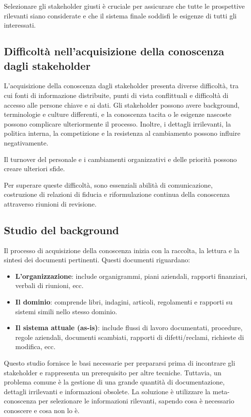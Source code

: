 Selezionare gli stakeholder giusti è cruciale per assicurare che tutte le
prospettive rilevanti siano considerate e che il sistema finale soddisfi le
esigenze di tutti gli interessati.

\subsection{Difficoltà nell'acquisizione della conoscenza dagli stakeholder}

L'acquisizione della conoscenza dagli stakeholder presenta diverse difficoltà,
tra cui fonti di informazione distribuite, punti di vista conflittuali e
difficoltà di accesso alle persone chiave e ai dati. Gli stakeholder possono
avere background, terminologie e culture differenti, e la conoscenza tacita o
le esigenze nascoste possono complicare ulteriormente il processo. Inoltre,
i dettagli irrilevanti, la politica interna, la competizione e la resistenza
al cambiamento possono influire negativamente.

Il turnover del personale e i cambiamenti organizzativi e delle priorità
possono creare ulteriori sfide. 

Per superare queste difficoltà, sono essenziali abilità di comunicazione,
costruzione di relazioni di fiducia e riformulazione continua della conoscenza
attraverso riunioni di revisione.

\subsection{Studio del background}

Il processo di acquisizione della conoscenza inizia con la raccolta, la
lettura e la sintesi dei documenti pertinenti. Questi documenti riguardano:

\begin{itemize}
    \item \textbf{L'organizzazione}: include organigrammi, piani aziendali, 
    rapporti finanziari, verbali di riunioni, ecc.
    \item \textbf{Il dominio}: comprende libri, indagini, articoli, regolamenti
    e rapporti su sistemi simili nello stesso dominio.
    \item \textbf{Il sistema attuale (as-is)}: include flussi di lavoro
    documentati, procedure, regole aziendali, documenti scambiati, rapporti
    di difetti/reclami, richieste di modifica, ecc.
\end{itemize}

Questo studio fornisce le basi necessarie per prepararsi prima di incontrare
gli stakeholder e rappresenta un prerequisito per altre tecniche. Tuttavia,
un problema comune è la gestione di una grande quantità di documentazione,
dettagli irrilevanti e informazioni obsolete. La soluzione è utilizzare la
meta-conoscenza per selezionare le informazioni rilevanti, sapendo cosa è
necessario conoscere e cosa non lo è.

